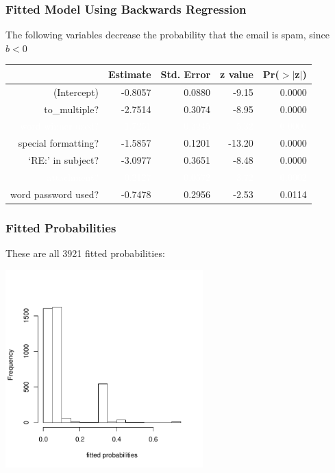 \documentclass[handout]{beamer}
\newcommand{\blue}[1]{\textcolor{blue2}{#1}}
\newcommand{\white}[1]{\textcolor{white}{#1}}
\begin{document}
\begin{frame}[fragile]
\frametitle{Fitted Model Using Backwards Regression}
The following variables decrease the probability that the email is spam, since $b<0$

\begin{table}[ht]
\centering
\begin{tabular}{r|rrrr}
  \hline
 & Estimate & Std. Error & z value & Pr($>$$|$z$|$) \\ 
  \hline
(Intercept) & -0.8057 & 0.0880 & -9.15 & 0.0000 \\ 
  \blue{to\_multiple?} & \blue{-2.7514} & \blue{0.3074} & \blue{-8.95} & \blue{0.0000} \\ 
  \white{word winner used?} & \white{1.7251} & \white{0.3245} & \white{5.32} & \white{0.0000} \\ 
  \blue{special formatting?} & \blue{-1.5857} & \blue{0.1201} & \blue{-13.20} & \blue{0.0000} \\ 
  \blue{`RE:' in subject?} & \blue{-3.0977} & \blue{0.3651} & \blue{-8.48} & \blue{0.0000} \\ 
  \white{attachment?} & \white{0.2127} & \white{0.0572} & \white{3.72} & \white{0.0002} \\ 
  \blue{word password used?} & \blue{-0.7478} & \blue{0.2956} & \blue{-2.53} & \blue{0.0114} \\ 
   \hline
\end{tabular}
\end{table} 

\end{frame}


\begin{frame}[fragile]
\frametitle{Fitted Probabilities}
These are all 3921 fitted probabilities:
\begin{center}
\includegraphics[width=3in]{figure/fitted.pdf}
\end{center}

\end{frame}
\end{document}
